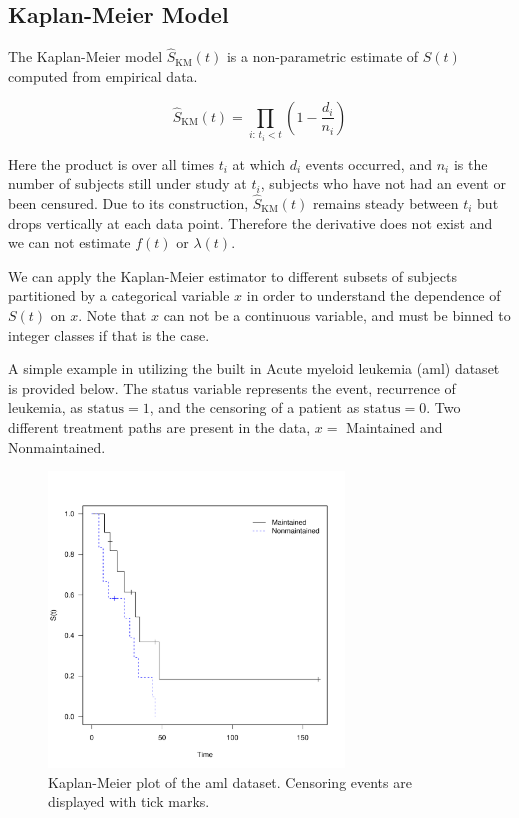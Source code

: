 \subsection{Kaplan-Meier Model}
\label{additional:Survival:KM}

The Kaplan-Meier model $\hat{S}_{\text{KM}}\left(t\right)$ is a non-parametric estimate of $S\left(t\right)$ computed from empirical data.

\begin{equation}\label{eq:Survival:KM}
\hat{S}_{\text{KM}}\left(t\right) = \prod_{i:\,t_{i} < t} \left(1 - \frac{d_{i}}{n_{i}}\right)
\end{equation}

\noindent Here the product is over all times $t_{i}$ at which $d_{i}$ events occurred,
and $n_{i}$ is the number of subjects still under study at $t_{i}$,
\ie subjects who have not had an event or been censured.
Due to its construction, $\hat{S}_{\text{KM}}\left(t\right)$ remains steady
between $t_{i}$ but drops vertically at each data point.
Therefore the derivative does not exist and we can not estimate $f\left(t\right)$ or $\lambda\left(t\right)$.


We can apply the Kaplan-Meier estimator to different subsets of subjects partitioned by a categorical variable $x$
in order to understand the dependence of $S\left(t\right)$ on $x$.
Note that $x$ can not be a continuous variable, and must be binned to integer classes if that is the case.

A simple example in \R utilizing the built in Acute myeloid leukemia (aml) dataset is provided below.
The status variable represents the event, recurrence of leukemia, as $\text{status}=1$, and the censoring of a patient as $\text{status}=0$.
Two different treatment paths are present in the data, $x=$ Maintained and Nonmaintained.

\begin{figure}[H]
\centering
\includegraphics[width=0.7\textwidth]{figures/survival/aml_km.pdf}
\vspace{0.2cm}
\caption{
Kaplan-Meier plot of the aml dataset. Censoring events are displayed with tick marks.
}
\label{fig:aml_km}
\end{figure}

